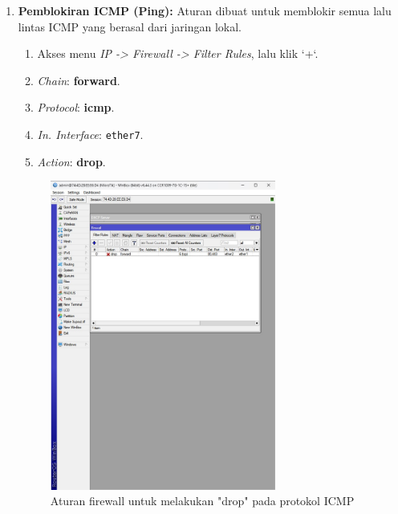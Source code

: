 \begin{enumerate}
    \item \textbf{Pemblokiran ICMP (Ping):} Aturan dibuat untuk memblokir semua lalu lintas ICMP yang berasal dari jaringan lokal.
    \begin{enumerate}
        \item Akses menu \textit{IP -> Firewall -> Filter Rules}, lalu klik `+`.
        \item \textit{Chain}: \textbf{forward}.
        \item \textit{Protocol}: \textbf{icmp}.
        \item \textit{In. Interface}: \texttt{ether7}.
        \item \textit{Action}: \textbf{drop}.
    \end{enumerate}
    \begin{figure}[H]
        \centering
        \includegraphics[width=0.7\textwidth]{img4/FireWallBlock.jpeg}
        \caption{Aturan firewall untuk melakukan "drop" pada protokol ICMP}
    \end{figure}
    

\end{enumerate}
